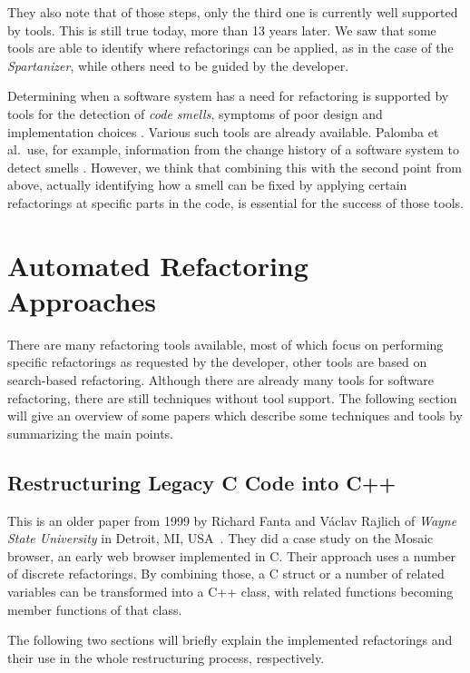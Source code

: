 \documentclass[conference,compsoc,a4paper]{IEEEtran}
\newcommand{\code}[1]{{\small\ttfamily #1}}
\begin{document}
They also note that of those steps, only the third one is currently well supported by tools. This is still true today, 
more than 13 years later. We saw that some tools are able to identify where refactorings can be applied, as in the case 
of the \emph{Spartanizer}, while others need to be guided by the developer.

Determining when a software system has a need for refactoring is supported by tools for the detection of \emph{code 
smells}, symptoms of poor design and implementation choices \cite{DBLP:books/daglib/0019908}. Various such tools are 
already available. Palomba et al.\ use, for example, information from the change history of a software system to detect 
smells \cite{DBLP:conf/kbse/PalombaBPOLP13}.
However, we think that combining this with the second point from above, actually identifying how a smell can be fixed 
by applying certain refactorings at specific parts in the code, is essential for the success of those tools.


\section{Automated Refactoring Approaches}\label{sec:approaches}

There are many refactoring tools available, most of which focus on performing specific refactorings as requested by the
developer, other tools are based on search-based refactoring. Although there are already many tools for software 
refactoring, there are still techniques without tool support. The following section will give an overview of some 
papers which describe some techniques and tools by summarizing the main points.

\subsection{Restructuring Legacy C Code into C++} \label{sec:cpp}

This is an older paper from 1999 by Richard Fanta and Václav Rajlich of \emph{Wayne State University} in Detroit, MI, 
USA~\cite{cpp}. They did a case study on the Mosaic browser, an early web browser implemented in C. Their approach uses 
a number of discrete refactorings. By combining those, a C \code{struct} or a number of related variables can be 
transformed into a C++ class, with related functions becoming member functions of that class.

The following two sections will briefly explain the implemented refactorings and their use in the whole restructuring 
process, respectively.
\end{document}
